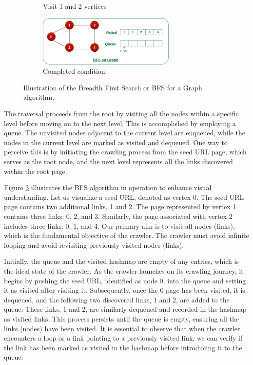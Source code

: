 \begin{figure}[ht]
\begin{subfigure}[b]{0.5\textwidth}
    \caption{Visit 1 and 2 vertices} 
    \label{fig:bfs-c} 
  \end{subfigure}%
  \begin{subfigure}[b]{0.5\textwidth}
    \centering
    \includegraphics[width=0.75\textwidth]{figures/bfs-4.png} 
    \caption{Completed condition} 
    \label{fig:bfs-d} 
  \end{subfigure} 
  \caption{Illustration of the Breadth First Search or BFS for a Graph algorithm.
 \cite{bfs}}
  \label{fig:bfs} 
\end{figure}

The traversal proceeds from the root by visiting all the nodes within a specific level before moving on to the next level. This is accomplished by employing a queue. The unvisited nodes adjacent to the current level are enqueued, while the nodes in the current level are marked as visited and dequeued. One way to perceive this is by initiating the crawling process from the seed URL page, which serves as the root node, and the next level represents all the links discovered within the root page.

Figure \ref{fig:bfs} illustrates the BFS algorithm in operation to enhance visual understanding. Let us visualize a seed URL, denoted as vertex 0. The seed URL page contains two additional links, 1 and 2. The page represented by vertex 1 contains three links: 0, 2, and 3. Similarly, the page associated with vertex 2 includes three links: 0, 1, and 4. Our primary aim is to visit all nodes (links), which is the fundamental objective of the crawler. The crawler must avoid infinite looping and avoid revisiting previously visited nodes (links).

Initially, the queue and the visited hashmap are empty of any entries, which is the ideal state of the crawler. As the crawler launches on its crawling journey, it begins by pushing the seed URL, identified as node 0, into the queue and setting it as visited after visiting it. Subsequently, once the 0 page has been visited, it is dequeued, and the following two discovered links, 1 and 2, are added to the queue. These links, 1 and 2, are similarly dequeued and recorded in the hashmap as visited links. This process persists until the queue is empty, ensuring all the links (nodes) have been visited. It is essential to observe that when the crawler encounters a loop or a link pointing to a previously visited link, we can verify if the link has been marked as visited in the hashmap before introducing it to the queue.

